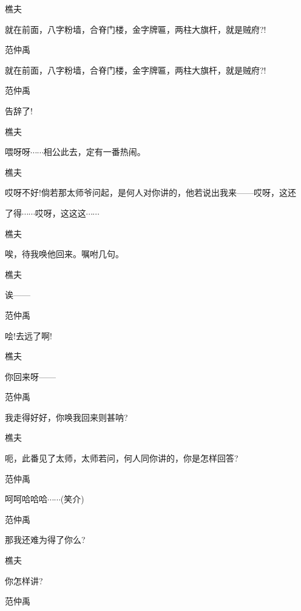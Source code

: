 樵夫\hspace{30pt}~

就在前面，八字粉墙，合脊门楼，金字牌匾，两柱大旗杆，就是贼府?!

范仲禹\hspace{20pt}~

就在前面，八字粉墙，合脊门楼，金字牌匾，两柱大旗杆，就是贼府?!

范仲禹\hspace{20pt}~

告辞了!

樵夫\hspace{30pt}~

喂呀呀$\cdots{}\cdots{}$相公此去，定有一番热闹。

樵夫

哎呀不好!倘若那太师爷问起，是何人对你讲的，他若说出我来------哎呀，这还

了得$\cdots{}\cdots{}$哎呀，这这这$\cdots{}\cdots{}$

樵夫\hspace{30pt}~

唉，待我唤他回来。嘱咐几句。

樵夫\hspace{30pt}~

诶------

范仲禹\hspace{20pt}~

哙!去远了啊!

樵夫\hspace{30pt}~

你回来呀------

范仲禹\hspace{20pt}~

我走得好好，你唤我回来则甚呐?

樵夫\hspace{30pt}~

呃，此番见了太师，太师若问，何人同你讲的，你是怎样回答?

范仲禹\hspace{20pt}~

呵呵哈哈哈$\cdots{}\cdots{}$(笑介)

范仲禹\hspace{20pt}~

那我还难为得了你么?

樵夫\hspace{30pt}~

你怎样讲?

范仲禹\hspace{20pt}~

